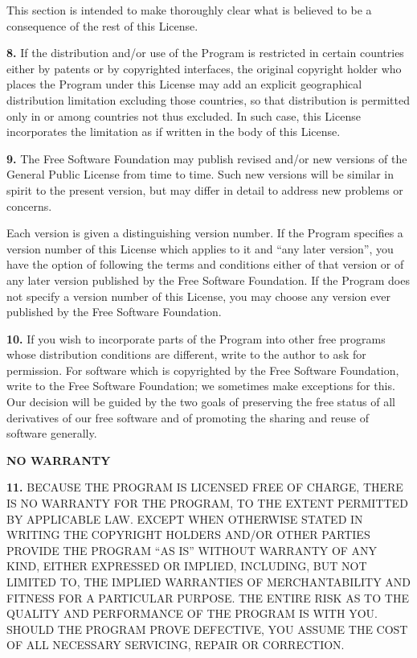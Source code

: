 {This section is intended to make thoroughly clear what is believed to be a
consequence of the rest of this License. 

{\bf 8.} If the distribution and/or use of the Program is restricted in
certain countries either by patents or by copyrighted interfaces, the original
copyright holder who places the Program under this License may add an explicit
geographical distribution limitation excluding those countries, so that
distribution is permitted only in or among countries not thus excluded. In
such case, this License incorporates the limitation as if written in the body
of this License. 

{\bf 9.} The Free Software Foundation may publish revised and/or new versions
of the General Public License from time to time. Such new versions will be
similar in spirit to the present version, but may differ in detail to address
new problems or concerns. 

Each version is given a distinguishing version number. If the Program
specifies a version number of this License which applies to it and ``any later
version'', you have the option of following the terms and conditions either of
that version or of any later version published by the Free Software
Foundation. If the Program does not specify a version number of this License,
you may choose any version ever published by the Free Software Foundation. 

{\bf 10.} If you wish to incorporate parts of the Program into other free
programs whose distribution conditions are different, write to the author to
ask for permission. For software which is copyrighted by the Free Software
Foundation, write to the Free Software Foundation; we sometimes make
exceptions for this. Our decision will be guided by the two goals of
preserving the free status of all derivatives of our free software and of
promoting the sharing and reuse of software generally. 

{\bf NO WARRANTY} 

{\bf 11.} BECAUSE THE PROGRAM IS LICENSED FREE OF CHARGE, THERE IS NO WARRANTY
FOR THE PROGRAM, TO THE EXTENT PERMITTED BY APPLICABLE LAW. EXCEPT WHEN
OTHERWISE STATED IN WRITING THE COPYRIGHT HOLDERS AND/OR OTHER PARTIES PROVIDE
THE PROGRAM ``AS IS'' WITHOUT WARRANTY OF ANY KIND, EITHER EXPRESSED OR
IMPLIED, INCLUDING, BUT NOT LIMITED TO, THE IMPLIED WARRANTIES OF
MERCHANTABILITY AND FITNESS FOR A PARTICULAR PURPOSE. THE ENTIRE RISK AS TO
THE QUALITY AND PERFORMANCE OF THE PROGRAM IS WITH YOU. SHOULD THE PROGRAM
PROVE DEFECTIVE, YOU ASSUME THE COST OF ALL NECESSARY SERVICING, REPAIR OR
CORRECTION. 

}
